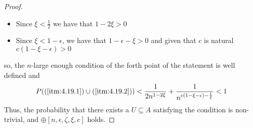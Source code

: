 \begin{proof}
\begin{itemize}
                \item Since $\xi < \frac{1}{2}$ we have that $1 - 2\xi > 0$
                \item Since $\xi < 1 - \epsilon$, we have that $1 - \epsilon - \xi > 0$ and given that $c$ is natural
                    $c (1 - \xi - \epsilon) > 0$
            \end{itemize}
                so, the $n$-large enough condition of the forth point of the statement is well defined and
            \[
                P((\ref{itm:4.19.1}) \cup (\ref{itm:4.19.2}))
                    < \frac{1}{2n^{1-2\xi}} + \frac{1}{n^{c (1 - \xi - \epsilon) - \frac{1}{\xi}}}
                    < 1
            \]
            Thus, the probability that there exists a $U \subseteq A$ satisfying the condition is non-trivial,
                and $\oplus[n, \epsilon, \zeta, \xi, c]$ holds.
        \end{proof}

